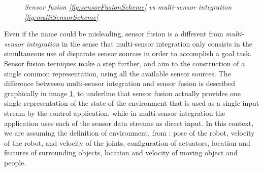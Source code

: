 \begin{figure}
	\centering
	\qquad
	\caption{\textit{Sensor fusion \ref{fig:sensorFusionScheme} vs multi-sensor integration \ref{fig:multiSensorScheme}}}
	\label{fig:fusionVsMultiSensor}
\end{figure}

Even if the name could be misleading, sensor fusion is a different from \textit{multi-sensor integration} in the sense that multi-sensor integration only consists in the simultaneous use of disparate sensor sources in order to accomplish a goal task. Sensor fusion tecniques make a step further, and aim to the construction of a single common representation, using all the available sensor sources. The difference betweeen multi-sensor integration and sensor fusion is described graphically in image \ref{fig:fusionVsMultiSensor}, to underline that sensor fusion actually provides one single representation of the state of the environment that is used as a single input stream by the control application, while in multi-sensor integration the application uses each of the sensor data streams as direct input. In this context, we are assuming the definition of environment, from \cite{stateOfEnvironment}: pose of the robot, 	velocity of the robot, and velocity of the joints, configuration of actuators, location and features of surrounding objects, location and velocity of moving object and people.

